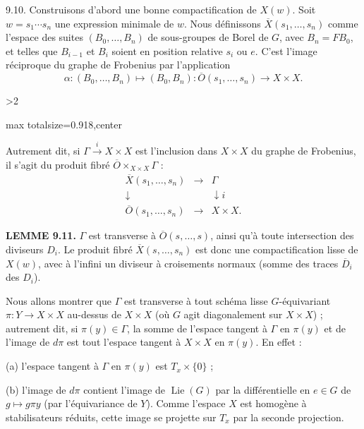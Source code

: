 \documentclass[9pt,twoside]{extarticle}
\newcommand{\EditionPage}[3]{%
  \ifnum#1>2\clearpage\fi
  \pdfbookmark[1]{Printed page #2}{fr-folio-#2}%
  \hypertarget{fr-physical-#1}{}%
  \noindent\begin{adjustbox}{max totalsize={\textwidth}{0.918\textheight},center}
  \begin{minipage}[t]{\textwidth}
  \fontsize{9.4}{11.1}\selectfont\justifying
  #3
  \end{minipage}
  \end{adjustbox}%
}
\begin{document}
{9.10. Construisons d'abord une bonne compactification de \(X(w)\). Soit \(w=s_1\cdots s_n\) une expression minimale de \(w\). Nous définissons \(\overline X(s_1,\ldots,s_n)\) comme l'espace des suites \((B_0,\ldots,B_n)\) de sous-groupes de Borel de \(G\), avec \(B_n=FB_0\), et telles que \(B_{i-1}\) et \(B_i\) soient en position relative \(s_i\) ou \(e\). C'est l'image réciproque du graphe de Frobenius par l'application \[
\alpha:(B_0,\ldots,B_n)\longmapsto(B_0,B_n):
\overline O(s_1,\ldots,s_n)\longrightarrow X\times X.
\]\par
}

\EditionPage{50}{151}{%
Autrement dit, si \(\Gamma\xrightarrow{i}X\times X\) est l'inclusion dans \(X\times X\) du graphe de Frobenius, il s'agit du produit fibré \(\overline O\times_{X\times X}\Gamma\) : \[
\begin{array}{ccc}
\overline X(s_1,\ldots,s_n)&\longrightarrow&\Gamma\\
\downarrow&&\downarrow i\\
\overline O(s_1,\ldots,s_n)&\longrightarrow&X\times X.
\end{array}
\]\par

\noindent\textbf{LEMME 9.11.} \(\Gamma\) est transverse à \(\overline O(s,\ldots,s)\), ainsi qu'à toute intersection des diviseurs \(D_i\). Le produit fibré \(\overline X(s,\ldots,s_n)\) est donc une compactification lisse de \(X(w)\), avec à l'infini un diviseur à croisements normaux (somme des traces \(\overline D_i\) des \(D_i\)).\par

Nous allons montrer que \(\Gamma\) est transverse à tout schéma lisse \(G\)-équivariant \(\pi:Y\to X\times X\) au-dessus de \(X\times X\) (où \(G\) agit diagonalement sur \(X\times X\)) ; autrement dit, si \(\pi(y)\in\Gamma\), la somme de l'espace tangent à \(\Gamma\) en \(\pi(y)\) et de l'image de \(d\pi\) est tout l'espace tangent à \(X\times X\) en \(\pi(y)\). En effet :\par

(a) l'espace tangent à \(\Gamma\) en \(\pi(y)\) est \(T_x\times\{0\}\) ;\par

(b) l'image de \(d\pi\) contient l'image de \(\operatorname{Lie}(G)\) par la différentielle en \(e\in G\) de \(g\mapsto g\pi y\) (par l'équivariance de \(Y\)). Comme l'espace \(X\) est homogène à stabilisateurs réduits, cette image se projette sur \(T_x\) par la seconde projection.\par

}
\end{document}
